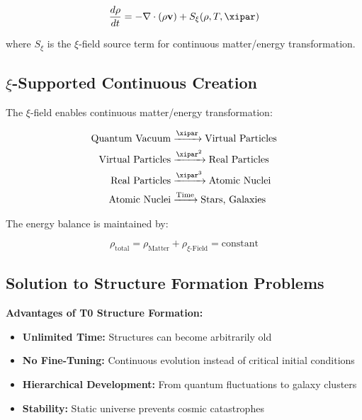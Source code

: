 	\begin{equation}
		\frac{d\rho}{dt} = -\nabla \cdot (\rho \mathbf{v}) + S_\xi(\rho, T, \xipar)
	\end{equation}
	
	where $S_\xi$ is the $\xi$-field source term for continuous matter/energy transformation.
	
	\subsection{$\xi$-Supported Continuous Creation}
	
	The $\xi$-field enables continuous matter/energy transformation:
	
	\begin{align}
		\text{Quantum Vacuum} &\xrightarrow{\xipar} \text{Virtual Particles} \\
		\text{Virtual Particles} &\xrightarrow{\xipar^2} \text{Real Particles} \\
		\text{Real Particles} &\xrightarrow{\xipar^3} \text{Atomic Nuclei} \\
		\text{Atomic Nuclei} &\xrightarrow{\text{Time}} \text{Stars, Galaxies}
	\end{align}
	
	The energy balance is maintained by:
	
	\begin{equation}
		\rho_{\text{total}} = \rho_{\text{Matter}} + \rho_{\xi\text{-Field}} = \text{constant}
	\end{equation}
	
	\subsection{Solution to Structure Formation Problems}
	
	\begin{keyresult}
		\textbf{Advantages of T0 Structure Formation:}
		
		\begin{itemize}
			\item \textbf{Unlimited Time:} Structures can become arbitrarily old
			\item \textbf{No Fine-Tuning:} Continuous evolution instead of critical initial conditions
			\item \textbf{Hierarchical Development:} From quantum fluctuations to galaxy clusters
			\item \textbf{Stability:} Static universe prevents cosmic catastrophes
		\end{itemize}
	\end{keyresult}
	
